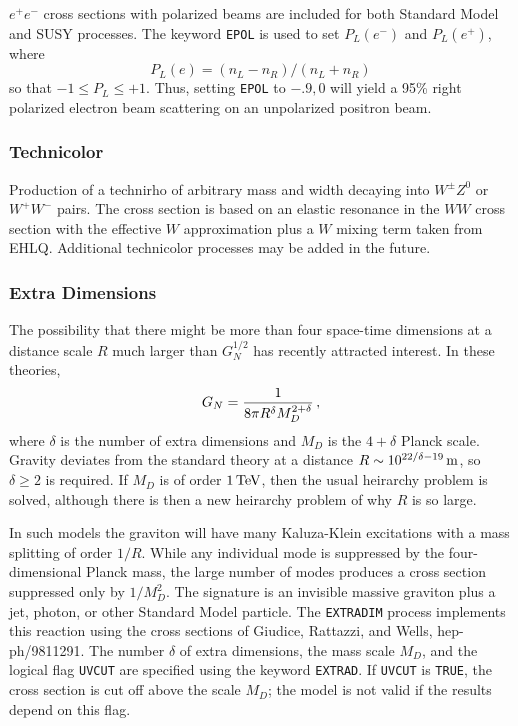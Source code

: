       $e^+e^-$ cross sections with polarized beams are included for
both Standard Model and SUSY processes. The keyword \verb|EPOL| is
used to set $P_L(e^-)$ and $P_L(e^+)$, where
$$
P_L(e) = (n_L-n_R)/(n_L+n_R)
$$
so that $-1 \le P_L \le +1$. Thus, setting \verb|EPOL| to $-.9,0$ will
yield a 95\% right polarized electron beam scattering on an unpolarized
positron beam.

\subsubsection{Technicolor} Production of a technirho of arbitrary
mass and width decaying into $W^\pm Z^0$ or $W^+ W^-$ pairs. The cross
section is based on an elastic resonance in the $WW$ cross section
with the effective $W$ approximation plus a $W$ mixing term taken from
EHLQ.  Additional technicolor processes may be added in the future.

\subsubsection{Extra Dimensions} The possibility that there might be
more than four space-time dimensions at a distance scale $R$ much larger
than $G_N^{1/2}$ has recently attracted interest. In these theories,
$$ 
G_N = {1 \over 8\pi R^\delta M_D^{2+\delta}}\,, 
$$
where $\delta$ is the number of extra dimensions and $M_D$ is the
$4+\delta$ Planck scale. Gravity deviates from the standard theory at a
distance $R \sim 10^{22/\delta-19}\,{\rm m}$, so $\delta\ge2$ is
required. If $M_D$ is of order $1\,{\rm TeV}$, then the usual heirarchy
problem is solved, although there is then a new heirarchy problem of why
$R$ is so large.

      In such models the graviton will have many Kaluza-Klein
excitations with a mass splitting of order $1/R$. While any individual
mode is suppressed by the four-dimensional Planck mass, the large number
of modes produces a cross section suppressed only by $1/M_D^2$. The
signature is an invisible massive graviton plus a jet, photon, or other
Standard Model particle. The \verb|EXTRADIM| process implements this
reaction using the cross sections of Giudice, Rattazzi, and Wells,
hep-ph/9811291. The number $\delta$ of extra dimensions, the mass scale
$M_D$, and the logical flag \verb|UVCUT| are specified using the keyword
\verb|EXTRAD|. If \verb|UVCUT| is \verb|TRUE|, the cross section is cut
off above the scale $M_D$; the model is not valid if the results depend
on this flag.

